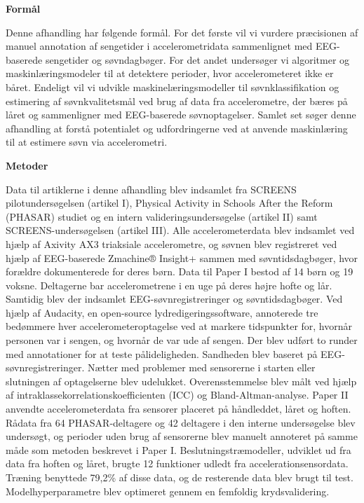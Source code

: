 \documentclass[
  9pt,
]{scrbook}
\begin{document}
\textbf{Formål}

Denne afhandling har følgende formål. For det første vil vi vurdere
præcisionen af manuel annotation af sengetider i accelerometridata
sammenlignet med EEG-baserede sengetider og søvndagbøger. For det andet
undersøger vi algoritmer og maskinlæringsmodeler til at detektere
perioder, hvor accelerometeret ikke er båret. Endeligt vil vi udvikle
maskinelæringsmodeller til søvnklassifikation og estimering af
søvnkvalitetsmål ved brug af data fra accelerometre, der bæres på låret
og sammenligner med EEG-baserede søvnoptagelser. Samlet set søger denne
afhandling at forstå potentialet og udfordringerne ved at anvende
maskinlæring til at estimere søvn via accelerometri.

\textbf{Metoder}

Data til artiklerne i denne afhandling blev indsamlet fra SCREENS
pilotundersøgelsen (artikel I), Physical Activity in Schools After the
Reform (PHASAR) studiet og en intern valideringsundersøgelse (artikel
II) samt SCREENS-undersøgelsen (artikel III). Alle accelerometerdata
blev indsamlet ved hjælp af Axivity AX3 triaksiale accelerometre, og
søvnen blev registreret ved hjælp af EEG-baserede Zmachine® Insight+
sammen med søvntidsdagbøger, hvor forældre dokumenterede for deres børn.
Data til Paper I bestod af 14 børn og 19 voksne. Deltagerne bar
accelerometrene i en uge på deres højre hofte og lår. Samtidig blev der
indsamlet EEG-søvnregistreringer og søvntidsdagbøger. Ved hjælp af
Audacity, en open-source lydredigeringssoftware, annoterede tre
bedømmere hver accelerometeroptagelse ved at markere tidspunkter for,
hvornår personen var i sengen, og hvornår de var ude af sengen. Der blev
udført to runder med annotationer for at teste pålideligheden. Sandheden
blev baseret på EEG-søvnregistreringer. Nætter med problemer med
sensorerne i starten eller slutningen af optagelserne blev udelukket.
Overensstemmelse blev målt ved hjælp af
intraklassekorrelationskoefficienten (ICC) og Bland-Altman-analyse.
Paper II anvendte accelerometerdata fra sensorer placeret på håndleddet,
låret og hoften. Rådata fra 64 PHASAR-deltagere og 42 deltagere i den
interne undersøgelse blev undersøgt, og perioder uden brug af sensorerne
blev manuelt annoteret på samme måde som metoden beskrevet i Paper I.
Beslutningstræmodeller, udviklet ud fra data fra hoften og låret, brugte
12 funktioner udledt fra accelerationsensordata. Træning benyttede
79,2\% af disse data, og de resterende data blev brugt til test.
Modelhyperparametre blev optimeret gennem en femfoldig krydsvalidering.
\end{document}

